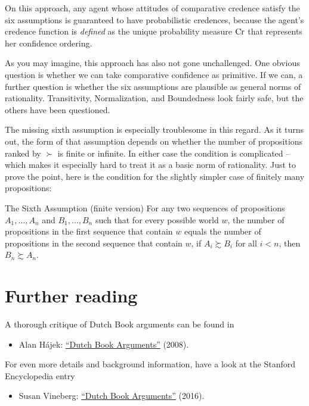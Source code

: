 On this approach, any agent whose attitudes of comparative credence
satisfy the six assumptions is guaranteed to have probabilistic
credences, because the agent's credence function is \emph{defined} as
the unique probability measure $\text{Cr}$ that represents her confidence
ordering.

As you may imagine, this approach has also not gone unchallenged. One
obvious question is whether we can take comparative confidence as
primitive. If we can, a further question is whether the six
assumptions are plausible as general norms of
rationality. Transitivity, Normalization, and Boundedness look fairly
safe, but the others have been questioned. 

The missing sixth assumption is especially troublesome in this
regard. As it turns out, the form of that assumption depends on
whether the number of propositions ranked by $\succ$ is finite or
infinite. In either case the condition is complicated -- which makes
it especially hard to treat it as a basic norm of rationality. Just to
prove the point, here is the condition for the slightly simpler case
of finitely many propositions:

\begin{genericthm}{The Sixth Assumption (finite version)}
  For any two sequences of propositions $A_1,\ldots,A_n$ and
  $B_1,\ldots,B_n$ such that for every possible world $w$, the number of
  propositions in the first sequence that contain $w$ equals the
  number of propositions in the second sequence that contain $w$, if
  $A_i \succsim B_i$ for all $i < n$, then $B_n \succsim A_n$.
\end{genericthm}



\section{Further reading}

A thorough critique of Dutch Book arguments can be found in
%
\begin{itemize}
\item Alan H\'ajek: \href{http://philrsss.anu.edu.au/people-defaults/alanh/papers/DBA.pdf}{``Dutch Book Arguments''} (2008).
\end{itemize}
%
For even more details and background information, have a look at the
Stanford Encyclopedia entry
%
\begin{itemize}
\item Susan Vineberg: \href{https://plato.stanford.edu/entries/dutch-book/}{``Dutch Book Arguments''} (2016).
\end{itemize}

